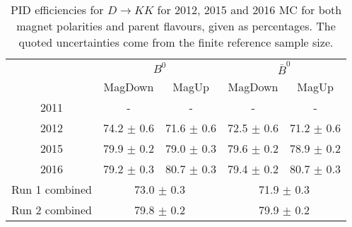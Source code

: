 \begin{table}[H]
    \centering
    \begin{tabular}{ccccc}
        \toprule
        & \multicolumn{2}{c}{$B^0$} &  \multicolumn{2}{c}{$\bar{B}^0$}\\
        & MagDown & MagUp & MagDown & MagUp\\
        \midrule
2011 & - & - & - & - \\
2012 & 74.2 $\pm$ 0.6 & 71.6 $\pm$ 0.6 & 72.5 $\pm$ 0.6 & 71.2 $\pm$ 0.6 \\
2015 & 79.9 $\pm$ 0.2 & 79.0 $\pm$ 0.3 & 79.6 $\pm$ 0.2 & 78.9 $\pm$ 0.2 \\
2016 & 79.2 $\pm$ 0.3 & 80.7 $\pm$ 0.3 & 79.4 $\pm$ 0.2 & 80.7 $\pm$ 0.3 \\
        \midrule
Run 1 combined & \multicolumn{2}{c}{73.0 $\pm$ 0.3} & \multicolumn{2}{c}{71.9 $\pm$ 0.3} \\
Run 2 combined & \multicolumn{2}{c}{79.8 $\pm$ 0.2} & \multicolumn{2}{c}{79.9 $\pm$ 0.2} \\
        \bottomrule
    \end{tabular}
    \caption{PID efficiencies for $D \to KK$ for 2012, 2015 and 2016 MC for both magnet polarities and parent flavours, given as percentages. The quoted  uncertainties come from the finite reference sample size.}
\label{tab:PID_efficiency_KK}
\end{table}
